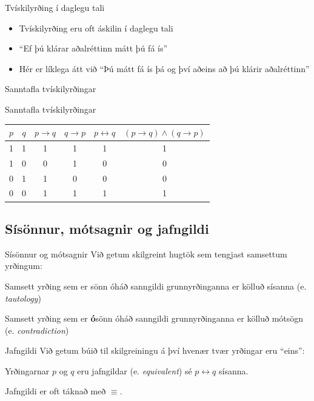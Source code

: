 \documentclass[handout]{beamer}
\begin{document}
\begin{frame}{Tvískilyrðing í daglegu tali}
\begin{itemize}
 \item Tvískilyrðing eru oft áskilin í daglegu tali
 \item ``Ef þú klárar aðalréttinn mátt þú fá ís'' \pause
 \item Hér er líklega átt við ``Þú mátt fá ís þá og því aðeins að þú klárir aðalréttinn''
\end{itemize}
\end{frame}

\begin{frame}{Sanntafla tvískilyrðingar}
\begin{center}
Sanntafla tvískilyrðingar
\begin{tabular}{cccccc}
\toprule
$p$&$q$&$p \to q$&$q \to p$&$p \leftrightarrow q$&$(p \to q) \land (q \to p)$\\
\midrule
1&1&1&1&1&1\\
1&0&0&1&0&0\\
0&1&1&0&0&0\\
0&0&1&1&1&1\\
\bottomrule
\end{tabular}
\end{center}
\end{frame}

\subsection{Sísönnur, mótsagnir og jafngildi}

\begin{frame}{Sísönnur og mótsagnir}
Við getum skilgreint hugtök sem tengjast samsettum yrðingum:

\begin{tcolorbox}[title=Sísanna]
Samsett yrðing sem er sönn óháð sanngildi grunnyrðinganna er kölluð sísanna (e. \emph{tautology})
\end{tcolorbox}

\begin{tcolorbox}[title=Mótsögn]
Samsett yrðing sem er \textbf{ó}sönn óháð sanngildi grunnyrðinganna er kölluð mótsögn (e. \emph{contradiction})
\end{tcolorbox}
\end{frame}

\begin{frame}{Jafngildi}
Við getum búið til skilgreiningu á því hvenær tvær yrðingar eru ``eins'':

\begin{tcolorbox}[title=Jafngildi]
Yrðingarnar $p$ og $q$ eru jafngildar (e. \emph{equivalent}) sé $p \leftrightarrow q$ sísanna.
\end{tcolorbox}

Jafngildi er oft táknað með $\equiv$.
\end{frame}
\end{document}
